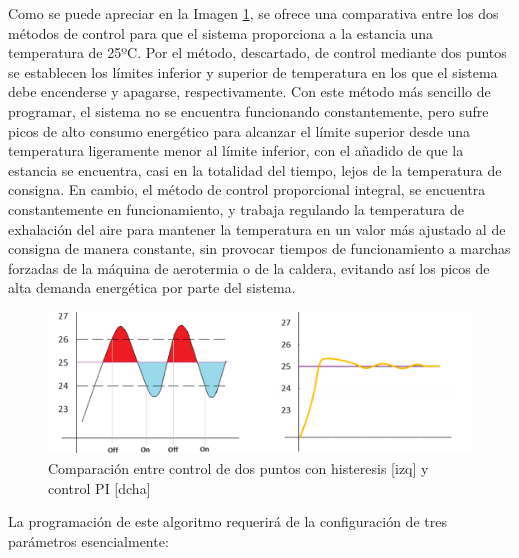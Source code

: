 \begin{itemize}
Como se puede apreciar en la Imagen \ref{fig:metodos_control}, se ofrece una comparativa entre los dos métodos de control para que el sistema proporciona a la estancia una temperatura de 25ºC. Por el método, descartado, de control mediante dos puntos se establecen los límites inferior y superior de temperatura en los que el sistema debe encenderse y apagarse, respectivamente. Con este método más sencillo de programar, el sistema no se encuentra funcionando constantemente, pero sufre picos de alto consumo energético para alcanzar el límite superior desde una temperatura ligeramente menor al límite inferior, con el añadido de que la estancia se encuentra, casi en la totalidad del tiempo, lejos de la temperatura de consigna. En cambio, el método de control proporcional integral, se encuentra constantemente en funcionamiento, y trabaja regulando la temperatura de exhalación del aire para mantener la temperatura en un valor más ajustado al de consigna de manera constante, sin provocar tiempos de funcionamiento a marchas forzadas de la máquina de aerotermia o de la caldera, evitando así los picos de alta demanda energética por parte del sistema. 
\bigskip
\begin{figure}[H]
\includegraphics[width=1.15\textwidth]{figures/metodos_control.png}   
\caption{Comparación entre control de dos puntos con histeresis [izq] y control PI [dcha]}
\label{fig:metodos_control}
\end{figure}
\bigskip
La programación de este algoritmo requerirá de la configuración de tres parámetros esencialmente:
	

\end{itemize}
